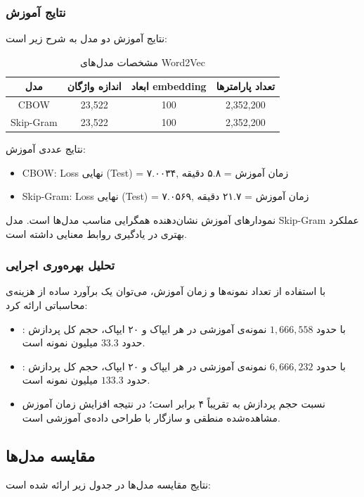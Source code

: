 \documentclass[12pt,a4paper]{article}
\begin{document}
\subsubsection{نتایج آموزش}
نتایج آموزش دو مدل به شرح زیر است:

\begin{table}[H]
\centering
\begin{tabular}{|c|c|c|c|}
\hline
\textbf{مدل} & \textbf{اندازه واژگان} & \textbf{ابعاد embedding} & \textbf{تعداد پارامترها} \\
\hline
CBOW & 23,522 & 100 & 2,352,200 \\
Skip-Gram & 23,522 & 100 & 2,352,200 \\
\hline
\end{tabular}
\caption{مشخصات مدل‌های Word2Vec}
\end{table}

نتایج عددی آموزش:
\begin{itemize}
\item CBOW: Loss نهایی (Test) = ۷.۰۰۳۴, زمان آموزش = ۵.۸ دقیقه
\item Skip-Gram: Loss نهایی (Test) = ۷.۰۵۶۹, زمان آموزش = ۲۱.۷ دقیقه
\end{itemize}

نمودارهای آموزش نشان‌دهنده همگرایی مناسب مدل‌ها است. مدل Skip-Gram عملکرد بهتری در یادگیری روابط معنایی داشته است.

\subsubsection{تحلیل بهره‌وری اجرایی}
با استفاده از تعداد نمونه‌ها و زمان آموزش، می‌توان یک برآورد ساده از هزینه‌ی محاسباتی ارائه کرد:
\begin{itemize}
\item {}: با حدود \(1{,}666{,}558\) نمونه‌ی آموزشی در هر ایپاک و ۲۰ ایپاک، حجم کل پردازش حدود \(33.3\) میلیون نمونه است.
\item {}: با حدود \(6{,}666{,}232\) نمونه‌ی آموزشی در هر ایپاک و ۲۰ ایپاک، حجم کل پردازش حدود \(133.3\) میلیون نمونه است.
\item نسبت حجم پردازش  به  تقریباً ۴ برابر است؛ در نتیجه افزایش زمان آموزش مشاهده‌شده منطقی و سازگار با طراحی داده‌ی آموزشی است.
\end{itemize}

\subsection{مقایسه مدل‌ها}
نتایج مقایسه مدل‌ها در جدول زیر ارائه شده است:
\end{document}
